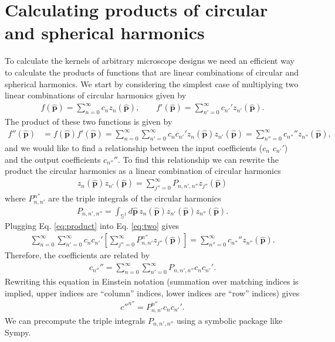 \documentclass[11pt]{article}
\providecommand{\mh}[1]{\mathbf{\hat{#1}}}
\providecommand{\mbb}[1]{\mathbb{#1}}
\begin{document}
\section{Calculating products of circular and spherical harmonics}
To calculate the kernels of arbitrary microscope designs we need an efficient
way to calculate the products of functions that are linear combinations of
circular and spherical harmonics. We start by considering the simplest case of
multiplying two linear combinations of circular harmonics given by
\begin{align}
  f(\mh{p}) = \sum_{n=0}^\infty c_nz_n(\mh{p}), \qquad f'(\mh{p}) = \sum_{n'=0}^\infty c_{n'}'z_{n'}(\mh{p}). 
\end{align}
The product of these two functions is given by 
\begin{align}
  f''(\mh{p}) &= f(\mh{p})f'(\mh{p})=\sum_{n=0}^\infty \sum_{n'=0}^\infty c_n c_{n'}' z_n(\mh{p}) z_{n'}(\mh{p}) = \sum_{n''=0}^{\infty} c_{n''}''z_{n''}(\mh{p}), \label{eq:two}
  \end{align}
  and we would like to find a relationship between the input coefficients ($c_n$
  $c_{n'}'$) and the output coefficients $c_{n''}''$. To find this relationship
  we can rewrite the product the circular harmonics as a linear combination of
  circular harmonics
  \begin{align}
    z_n(\mh{p})z_{n'}(\mh{p}) = \sum_{j''=0}^{\infty}P_{n,n',n''}z_{j''}(\mh{p})\label{eq:product}
  \end{align}
  where $P^{n''}_{n,n'}$ are the triple integrals of the circular harmonics
  \begin{align}
    P_{n,n',n''} = \int_{\mbb{S}^1}d\mh{p}\, z_{n}(\mh{p})z_{n'}(\mh{p})z_{n''}(\mh{p}).\label{eq:triple}
  \end{align}
  Plugging Eq. \ref{eq:product} into Eq. \ref{eq:two} gives
  \begin{align}
    \sum_{n=0}^\infty \sum_{n'=0}^\infty c_n c_{n'}' \left[\sum_{j''=0}^{\infty}P^{n''}_{n,n'}z_{j''}(\mh{p})\right] = \sum_{n''=0}^{\infty} c_{n''}''z_{n''}(\mh{p}).    
  \end{align}
  Therefore, the coefficients are related by
  \begin{align}
    c_{n''}'' = \sum_{n=0}^\infty \sum_{n'=0}^\infty P_{n,n',n''} c_n c_{n'}'.
  \end{align}
  Rewriting this equation in Einstein notation (summation over matching indices
  is implied, upper indices are ``column'' indices, lower indices are ``row''
  indices) gives
  \begin{align}
    {c''}^{n''} = P^{n''}_{n,n'} c_n c_{n'}'.
  \end{align}
  We can precompute the triple integrals $P_{n,n',n''}$ using a symbolic package
  like Sympy.
  
\end{document}
